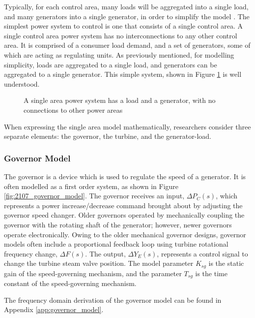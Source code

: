 Typically, for each control area, many loads will be aggregated into a single load, and many generators into a single generator, in order to simplify the model \cite{Grainger1994}. The simplest power system to control is one that consists of a single control area. A single control area power system has no interconnections to any other control area. It is comprised of a consumer load demand, and a set of generators, some of which are acting as regulating units. As previously mentioned, for modelling simplicity, loads are aggregated to a single load, and generators can be aggregated to a single generator. This simple system, shown in Figure \ref{fig:2106_single_area_system_overview} is well understood.

\begin{figure}[h]
	\centering
	\resizebox{4.5cm}{!}{}
	\caption[Single area power system]{A single area power system has a load and a generator, with no connections to other power areas}
	\label{fig:2106_single_area_system_overview}
\end{figure}

When expressing the single area model mathematically, researchers consider three separate elements: the governor, the turbine, and the generator-load.

\subsubsection{Governor Model}
The governor is a device which is used to regulate the speed of a generator. It is often modelled as a first order system, as shown in Figure \ref{fig:2107_governor_model}. The governor receives an input, $\Delta P_C(s)$, which represents a power increase/decrease command brought about by adjusting the governor speed changer. Older governors operated by mechanically coupling the governor with the rotating shaft of the generator; however, newer governors operate electronically. Owing to the older mechanical governor designs, governor models often include a proportional feedback loop using turbine rotational frequency change, $\Delta F(s)$. The output, $\Delta Y_E(s)$, represents a control signal to change the turbine steam valve position. The model parameter $K_{sg}$ is the static gain of the speed-governing mechanism, and the parameter $T_{sg}$ is the time constant of the speed-governing mechanism.

The frequency domain derivation of the governor model can be found in Appendix \ref{app:governor_model}.

